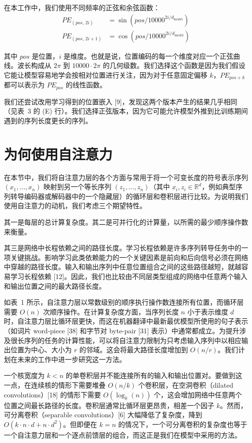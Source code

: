 \documentclass[11pt,UTF8,fontset=fandol]{ctexart}
\newcommand{\dmodel}{d_{\mathrm{model}}}
\begin{document}
在本工作中，我们使用不同频率的正弦和余弦函数：
\begin{align*}
PE_{(pos,\, 2i)} &= \sin\!\left(pos/10000^{2i/\dmodel}\right)\\
PE_{(pos,\, 2i+1)} &= \cos\!\left(pos/10000^{2i/\dmodel}\right)
\end{align*}

其中 $pos$ 是位置，$i$ 是维度。也就是说，位置编码的每一个维度对应一个正弦曲线。波长构成从 $2\pi$ 到 $10000 \cdot 2\pi$ 的几何级数。我们选择这个函数是因为我们假设它能让模型容易地学会按相对位置进行关注，因为对于任意固定偏移 $k$，$PE_{pos+k}$ 都可以表示为 $PE_{pos}$ 的线性函数。

我们还尝试改用学习得到的位置嵌入 [9]，发现这两个版本产生的结果几乎相同（见表~3 的 (E) 行）。我们选择正弦版本，因为它可能允许模型外推到比训练期间遇到的序列长度更长的序列。

\section{为何使用自注意力}

在本节中，我们将自注意力层的各个方面与常用于将一个可变长度的符号表示序列 $(x_1, \ldots, x_n)$ 映射到另一个等长序列 $(z_1, \ldots, z_n)$（其中 $x_i, z_i \in \mathbb{R}^d$，例如典型序列转导编码器或解码器中的一个隐藏层）的循环层和卷积层进行比较。为说明我们使用自注意力的动机，我们考虑三个期望特性。

其一是每层的总计算复杂度。其二是可并行化的计算量，以所需的最少顺序操作数来衡量。

其三是网络中长程依赖之间的路径长度。学习长程依赖是许多序列转导任务中的一项关键挑战。影响学习此类依赖能力的一个关键因素是前向和后向信号必须在网络中穿越的路径长度。输入和输出序列中任意位置组合之间的这些路径越短，就越容易学习长程依赖 [12]。因此，我们也比较由不同层类型组成的网络中任意两个输入和输出位置之间的最大路径长度。

如表~1 所示，自注意力层以常数级别的顺序执行操作数连接所有位置，而循环层需要 $O(n)$ 次顺序操作。在计算复杂度方面，当序列长度 $n$ 小于表示维度 $d$ 时，自注意力层比循环层更快，而这在机器翻译中最新最优模型所使用的句子表示（如词片 word-piece [38] 和字节对 byte-pair [31] 表示）中通常都成立。为提升涉及很长序列的任务的计算性能，可以将自注意力限制为只考虑输入序列中以相应输出位置为中心、大小为 $r$ 的邻域。这会将最大路径长度增加到 $O(n/r)$。我们计划在未来的工作中进一步研究这一方法。

一个核宽度为 $k < n$ 的单卷积层并不能连接所有的输入和输出位置对。要做到这一点，在连续核的情形下需要堆叠 $O(n/k)$ 个卷积层，在空洞卷积（dilated convolutions）[18] 的情形下需要 $O(\log_k(n))$ 个，这会增加网络中任意两个位置之间最长路径的长度。卷积层通常比循环层更昂贵，相差一个因子 $k$。然而，可分离卷积（separable convolutions）[6] 大幅降低了复杂度，降到 $O(k \cdot n \cdot d + n \cdot d^2)$。但即便在 $k = n$ 的情况下，一个可分离卷积的复杂度也等于一个自注意力层和一个逐点前馈层的组合，而这正是我们在模型中采用的方法。
\end{document}
